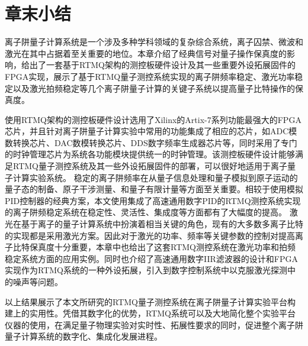 \newpage
\section[章末小结]{章末小结}

离子阱量子计算系统是一个涉及多种学科领域的复杂综合系统，离子囚禁、微波和激光在其中占据着至关重要的地位。本章介绍了经典信号对量子操作保真度的影响，给出了一套基于RTMQ架构的测控板硬件设计及其一些重要外设拓展固件的FPGA实现，展示了基于RTMQ量子测控系统实现的离子阱频率稳定、激光功率稳定以及激光拍频稳定等几个离子阱量子计算的关键子系统以提高量子比特操作的保真度。

使用RTMQ架构的测控板硬件设计选用了Xilinx的Artix-7系列功能最强大的FPGA芯片，并且针对离子阱量子计算实验中常用的功能集成了相应的芯片，如ADC模数转换芯片、DAC数模转换芯片、DDS数字频率生成器芯片等，同时采用了专门的时钟管理芯片为系统各功能模块提供统一的时钟管理。该测控板硬件设计能够满足RTMQ量子测控系统及其一些外设拓展固件的部署，可以很好地适用于离子量子计算实验系统。
稳定的离子阱频率在从量子信息处理和量子模拟到原子运动的量子态的制备、原子干涉测量、和量子有限计量等方面至关重要。相较于使用模拟PID控制器的经典方案，本文使用集成了高速通用数字PID的RTMQ测控系统实现的离子阱频稳定系统在稳定性、灵活性、集成度等方面都有了大幅度的提高。
激光在基于离子的量子计算系统中扮演着相当关键的角色，现有的大多数多离子比特的实现都是采用激光方案。因此对于激光的功率、频率等关键参数的控制对提高离子比特保真度十分重要，本章中也给出了这套RTMQ测控系统在激光功率和拍频稳定系统方面的应用实例。同时也介绍了高速通用数字IIR滤波器的设计和FPGA实现作为RTMQ系统的一种外设拓展，引入到数字控制系统中以克服激光探测中的噪声等问题。

以上结果展示了本文所研究的RTMQ量子测控系统在离子阱量子计算实验平台构建上的实用性。凭借其数字化的优势，RTMQ系统可以及大地简化整个实验平台仪器的使用，在满足量子物理实验对实时性、拓展性要求的同时，促进整个离子阱量子计算系统的数字化、集成化发展进程。





